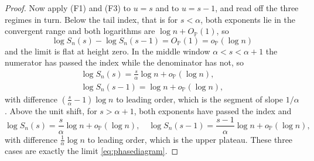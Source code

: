 \documentclass[sn-mathphys-num]{sn-jnl}
\theoremstyle{thmstyleone}%
\theoremstyle{thmstyletwo}%
\theoremstyle{thmstylethree}%
\theoremstyle{thmstyleone}%
\providecommand{\Prob}{\mathbb{P}}
\begin{document}
\begin{appendices}
\begin{proof}
			Now apply (F1) and (F3) to $u=s$ and to $u=s-1$, and read off
			the three regimes in turn. Below the tail index, that is for
			$s<\alpha$, both exponents lie in the convergent range and both
			logarithms are $\log n+O_{\Prob}(1)$, so
			\begin{equation}\label{eq:phase1}
				\log S_n(s)-\log S_n(s-1)=O_{\Prob}(1)
				=o_{\Prob}(\log n)
			\end{equation}
			and the limit is flat at height zero. In the middle window
			$\alpha<s<\alpha+1$ the numerator has passed the index while
			the denominator has not, so
			\begin{equation}\label{eq:phase2}
				\begin{gathered}
					\log S_n(s)=\frac s\alpha\log n+o_{\Prob}(\log n),\\
					\log S_n(s-1)=\log n+o_{\Prob}(\log n),
				\end{gathered}
			\end{equation}
			with difference $(\tfrac s\alpha-1)\log n$ to leading order,
			which is the segment of slope $1/\alpha$. Above the unit shift,
			for $s>\alpha+1$, both exponents have passed the index and
			\begin{equation}\label{eq:phase3}
				\log S_n(s)=\frac s\alpha\log n+o_{\Prob}(\log n),
				\quad
				\log S_n(s-1)=\frac{s-1}\alpha\log n
				+o_{\Prob}(\log n),
			\end{equation}
			with difference $\tfrac1\alpha\log n$ to leading order, which
			is the upper plateau. These three cases are exactly the limit
			\eqref{eq:phasediagram}.
		\end{proof}
		
		\proptailrate*
		

\end{appendices}
\end{document}
